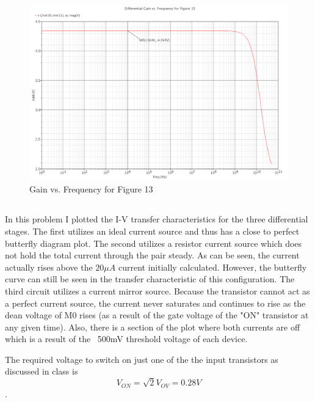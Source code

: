 \documentclass{article}
\begin{document}
\begin{figure}[H]
\centering
\includegraphics[width=6in]{p3_1c_gain}
\caption{Gain vs. Frequency for Figure 13}
\label{3_1c_gain}
\end{figure}
\newpage

\subsection{}
In this problem I plotted the I-V transfer characteristics for the three differential stages. The first utilizes an ideal current source and thus has a close to perfect butterfly diagram plot. The second utilizes a resistor current source which does not hold the total current through the pair steady. As can be seen, the current actually rises above the $20\mu A$ current initially calculated. However, the butterfly curve can still be seen in the transfer characteristic of this configuration. The third circuit utilizes a current mirror source. Because the transistor cannot act as a perfect current source, the current never saturates and continues to rise as the dean voltage of M0 rises (as a result of the gate voltage of the "ON" transistor at any given time). Also, there is a section of the plot where both currents are off which is a result of the ~500mV threshold voltage of each device.

The required voltage to switch on just one of the the input transistors as discussed in class is
\begin{equation}
V_{ON} = \sqrt{2}V_{OV} = 0.28V
\end{equation}.
\end{document}
